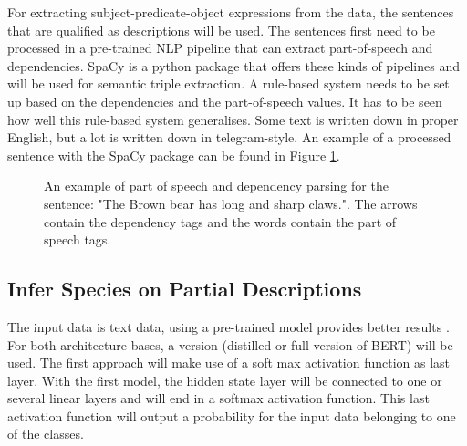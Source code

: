 \documentclass[a4paper, 12pt, oneside]{book} %
\begin{document}
For extracting subject-predicate-object expressions from the data, the sentences that are qualified as descriptions will be used.
The sentences first need to be processed in a pre-trained NLP pipeline that can extract part-of-speech and dependencies.
SpaCy \autocite{honnibal_spacy_2020} is a python package that offers these kinds of pipelines and will be used for semantic triple extraction.
A rule-based system needs to be set up based on the dependencies and the part-of-speech values. 
It has to be seen how well this rule-based system generalises.
Some text is written down in proper English, but a lot is written down in telegram-style.
An example of a processed sentence with the SpaCy package can be found in Figure \ref{fig:PoS_example}.

\begin{figure} [t]
    \centering
    \vspace{0cm}
    \makebox[\textwidth][c]{}
    \caption{An example of part of speech and dependency parsing for the sentence: "The Brown bear has long and sharp claws.". The arrows contain the dependency tags and the words contain the part of speech tags.}
    \label{fig:PoS_example}
\end{figure}

\subsection{Infer Species on Partial Descriptions}
The input data is text data, using a pre-trained model provides better results \autocite{devlin_bert_2019, sanh_distilbert_2020, mikolov_distributed_2013}.
For both architecture bases, a version (distilled or full version of BERT) will be used.
The first approach will make use of a soft max activation function as last layer.
With the first model, the hidden state layer will be connected to one or several linear layers and will end in a softmax activation function.
This last activation function will output a probability for the input data belonging to one of the classes.
\end{document}

